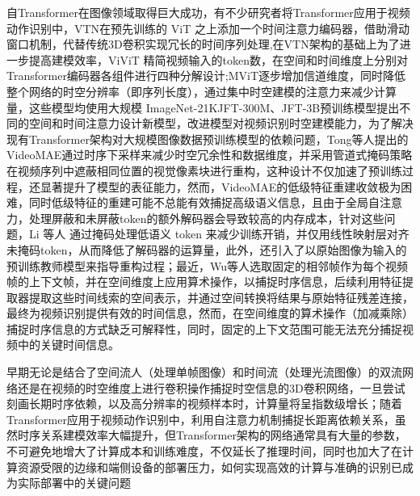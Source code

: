 \documentclass[10.5pt,letterpaper]{article}
\begin{document}
自Transformer在图像领域取得巨大成功，有不少研究者将Transformer应用于视频动作识别中\cite{dosovitskiy-iclr2021-transformers}\cite{arnab-iccv2021-vivit}\cite{liu-cvpr2022-video}\cite{yan-cvpr2022-multiview}，VTN\cite{neimark-cvpr2021-video}在预先训练的 ViT 之上添加一个时间注意力编码器，借助滑动窗口机制，代替传统3D卷积实现冗长的时间序列处理,在VTN架构的基础上为了进一步提高建模效率，ViViT \cite{arnab-iccv2021-vivit}精简视频输入的token数，在空间和时间维度上分别对Transformer编码器各组件进行四种分解设计;MViT\cite{fan-cvpr2021-multiscale}逐步增加信道维度，同时降低整个网络的时空分辨率（即序列长度），通过集中时空建模的注意力来减少计算量，这些模型均使用大规模 ImageNet-21K\cite{ridnik-nips2021-imagenet}JFT-300M\cite{sun-iccv2017-revisit}、JFT-3B\cite{zhai-cvpr2022-scaling}预训练模型提出不同的空间和时间注意力设计新模型，改进模型对视频识别时空建模能力，为了解决现有Transformer架构对大规模图像数据预训练模型的依赖问题，Tong等人\cite{tong-nips2022-videomae}提出的VideoMAE通过时序下采样来减少时空冗余性和数据维度，并采用管道式掩码策略在视频序列中遮蔽相同位置的视觉像素块进行重构，这种设计不仅加速了预训练过程，还显著提升了模型的表征能力，然而，VideoMAE的低级特征重建收敛极为困难，同时低级特征的重建可能不总能有效捕捉高级语义信息，且由于全局自注意力，处理屏蔽和未屏蔽token的额外解码器会导致较高的内存成本，针对这些问题，Li 等人 \cite{li-cvpr2023-unmasked} 通过掩码处理低语义 token 来减少训练开销，并仅用线性映射层对齐未掩码token，从而降低了解码器的运算量，此外，还引入了以原始图像为输入的预训练教师模型来指导重构过程；最近，Wu等人\cite{wu-iccv2023-temporal}选取固定的相邻帧作为每个视频帧的上下文帧，并在空间维度上应用算术操作，以捕捉时序信息，后续利用特征提取器提取这些时间线索的空间表示，并通过空间转换将结果与原始特征残差连接，最终为视频识别提供有效的时间信息，然而，在空间维度的算术操作（加减乘除）捕捉时序信息的方式缺乏可解释性，同时，固定的上下文范围可能无法充分捕捉视频中的关键时间信息。

早期无论是结合了空间流人\cite{ji-tpami2012-3d}（处理单帧图像）和时间流（处理光流图像）\cite{simon-nips2014-twostream}的双流网络还是在视频的时空维度上进行卷积操作捕捉时空信息的3D卷积网络，一旦尝试刻画长期时序依赖，以及高分辨率的视频样本时，计算量将呈指数级增长；随着Transformer应用于视频动作识别中，利用自注意力机制捕捉长距离依赖关系，虽然时序关系建模效率大幅提升，但Transformer架构\cite{dosovitskiy-iclr2021-transformers}的网络通常具有大量的参数，不可避免地增大了计算成本和训练难度，不仅延长了推理时间，同时也加大了在计算资源受限的边缘和端侧设备的部署压力，如何实现高效的计算与准确的识别已成为实际部署中的关键问题
\end{document}
